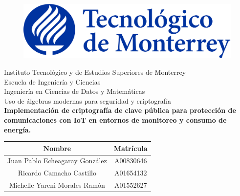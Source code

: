 \documentclass{article}
\begin{document}
    \begin{titlepage}
        \begin{center}
            \begin{figure}
                \centering
                \includegraphics[scale=0.13]{logo_itesm.png}\\ %
            \end{figure}
            \vspace{5cm}
            \LARGE{Instituto Tecnológico y de Estudios Superiores de Monterrey}\\
            \vspace{1cm}
            \large Escuela de Ingeniería y Ciencias \\
            \vspace{0.2cm}
            \large Ingeniería en Ciencias de Datos y Matemáticas \\
            \vspace{0.2cm}
            \large Uso de álgebras modernas para seguridad y criptografía \\
            \vspace{1cm}
            \textbf{Implementación de criptografía de clave pública para protección de comunicaciones con IoT en entornos de monitoreo y consumo de energía.}\\ %
            \vspace{0.7cm}
            \begin{table}[h!]
                \centering
                \begin{tabular}{ ||c|c|| }
                    \hline
                    Nombre & Matrícula \\
                    \hline
                    Juan Pablo Echeagaray González & A00830646 \\
                    \hline
                    Ricardo Camacho Castillo & A01654132 \\
                    \hline
                    Michelle Yareni Morales Ramón & A01552627 \\

\end{tabular}
\end{table}
\end{center}
\end{titlepage}
\end{document}
